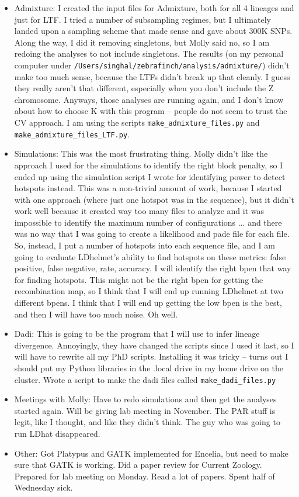 \documentclass[idxtotoc,hyperref,openany,oneside]{labbook} %
\begin{document}
\begin{itemize}
\item Admixture: I created the input files for Admixture, both for all 4 lineages and just for LTF. I tried a number of subsampling regimes, but I ultimately landed upon a sampling scheme that made sense and gave about 300K SNPs. Along the way, I did it removing singletons, but Molly said no, so I am redoing the analyses to not include singletons. The results (on my personal computer under \verb+/Users/singhal/zebrafinch/analysis/admixture/+) didn't make too much sense, because the LTFs didn't break up that cleanly. I guess they really aren't that different, especially when you don't include the Z chromosome. Anyways, those analyses are running again, and I don't know about how to choose K with this program -- people do not seem to trust the CV approach. I am using the scripts \verb+make_admixture_files.py+ and \verb+make_admixture_files_LTF.py+.
\item Simulations: This was the most frustrating thing. Molly didn't like the approach I used for the simulations to identify the right block penalty, so I ended up using the simulation script I wrote for identifying power to detect hotspots instead. This was a non-trivial amount of work, because I started with one approach (where just one hotspot was in the sequence), but it didn't work well because it created way too many files to analyze and it was impossible to identify the maximum number of configurations ... and there was no way that I was going to create a likelihood and pade file for each file. So, instead, I put a number of hotspots into each sequence file, and I am going to evaluate LDhelmet's ability to find hotspots on these metrics: false positive, false negative, rate, accuracy. I will identify the right bpen that way for finding hotspots. This might not be the right bpen for getting the recombination map, so I think that I will end up running LDhelmet at two different bpens. I think that I will end up getting the low bpen is the best, and then I will have too much noise. Oh well.
\item Dadi: This is going to be the program that I will use to infer lineage divergence. Annoyingly, they have changed the scripts since I used it last, so I will have to rewrite all my PhD scripts. Installing it was tricky -- turns out I should put my Python libraries in the .local drive in my home drive on the cluster. Wrote a script to make the dadi files called \verb+make_dadi_files.py+
\item Meetings with Molly: Have to redo simulations and then get the analyses started again. Will be giving lab meeting in November. The PAR stuff is legit, like I thought, and like they didn't think. The guy who was going to run LDhat disappeared.
\item Other: Got Platypus and GATK implemented for Encelia, but need to make sure that GATK is working. Did a paper review for Current Zoology. Prepared for lab meeting on Monday. Read a lot of papers. Spent half of Wednesday sick.
\end{itemize}
\end{document}
